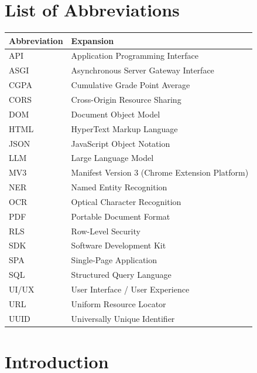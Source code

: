 \documentclass[12pt,a4paper]{report}
\begin{document}
\tableofcontents
\listoffigures
\listoftables

\chapter*{List of Abbreviations}
\begin{table}[H]
\centering
\begin{tabular}{@{}ll@{}}
\toprule
\textbf{Abbreviation} & \textbf{Expansion} \\ \midrule
API   & Application Programming Interface \\
ASGI  & Asynchronous Server Gateway Interface \\
CGPA  & Cumulative Grade Point Average \\
CORS  & Cross-Origin Resource Sharing \\
DOM   & Document Object Model \\
HTML  & HyperText Markup Language \\
JSON  & JavaScript Object Notation \\
LLM   & Large Language Model \\
MV3   & Manifest Version 3 (Chrome Extension Platform) \\
NER   & Named Entity Recognition \\
OCR   & Optical Character Recognition \\
PDF   & Portable Document Format \\
RLS   & Row-Level Security \\
SDK   & Software Development Kit \\
SPA   & Single-Page Application \\
SQL   & Structured Query Language \\
UI/UX & User Interface / User Experience \\
URL   & Uniform Resource Locator \\
UUID  & Universally Unique Identifier \\
\bottomrule
\end{tabular}
\end{table}

\chapter{Introduction}
\end{document}

